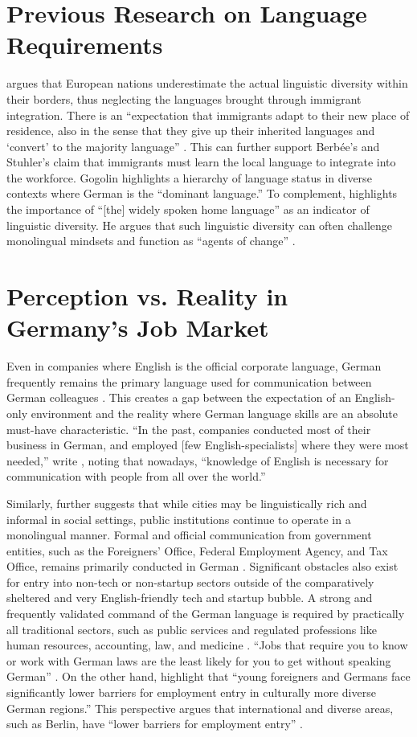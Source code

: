 \section{Previous Research on Language Requirements}
\citet{gogolin02} argues that European nations underestimate the actual linguistic diversity within their borders, thus neglecting the languages brought through immigrant integration. There is an “expectation that immigrants adapt to their new place of residence, also in the sense that they give up their inherited languages and ‘convert’ to the majority language” \citep{gogolin02}. This can further support Berbée’s and Stuhler’s claim that immigrants must learn the local language to integrate into the workforce. Gogolin highlights a hierarchy of language status in diverse contexts where German is the “dominant language.” To complement, \citet{Extra10diversity} highlights the importance of “[the] widely spoken home language” as an indicator of linguistic diversity. He argues that such linguistic diversity can often challenge monolingual mindsets and function as “agents of change” \citep{Extra10diversity}.

\section{Perception vs. Reality in Germany's Job Market}
Even in companies where English is the official corporate language, German frequently remains the primary language used for communication between German colleagues \citep{ErlingWalton07}. This creates a gap between the expectation of an English-only environment and the reality where German language skills are an absolute must-have characteristic. “In the past, companies conducted most of their business in German, and employed [few English-specialists] where they were most needed,” write \citet{ErlingWalton07}, noting that nowadays, “knowledge of English is necessary for communication with people from all over the world.”

Similarly, \citet{Extra10diversity} further suggests that while cities may be linguistically rich and informal in social settings, public institutions continue to operate in a monolingual manner. Formal and official communication from government entities, such as the Foreigners’ Office, Federal Employment Agency, and Tax Office, remains primarily conducted in German \citep{kummuni25Language}. Significant obstacles also exist for entry into non-tech or non-startup sectors outside of the comparatively sheltered and very English-friendly tech and startup bubble. A strong and frequently validated command of the German language is required by practically all traditional sectors, such as public services and regulated professions like human resources, accounting, law, and medicine \citep{simplegermany25}. “Jobs that require you to know or work with German laws are the least likely for you to get without speaking German” \citep{simplegermany25}. On the other hand, \citet{DamelangHaas12} highlight that “young foreigners and Germans face significantly lower barriers for employment entry in culturally more diverse German regions.” This perspective argues that international and diverse areas, such as Berlin, have “lower barriers for employment entry” \citep{DamelangHaas12}. \par